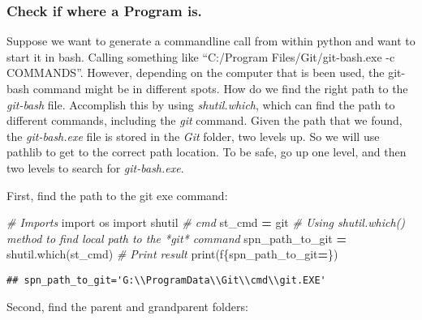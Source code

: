 \documentclass[
]{book}
\newenvironment{Shaded}{\begin{snugshade}}{\end{snugshade}}
\newcommand{\BuiltInTok}[1]{#1}
\newcommand{\CommentTok}[1]{\textcolor[rgb]{0.56,0.35,0.01}{\textit{#1}}}
\newcommand{\ImportTok}[1]{#1}
\newcommand{\NormalTok}[1]{#1}
\newcommand{\OperatorTok}[1]{\textcolor[rgb]{0.81,0.36,0.00}{\textbf{#1}}}
\newcommand{\SpecialCharTok}[1]{\textcolor[rgb]{0.00,0.00,0.00}{#1}}
\newcommand{\SpecialStringTok}[1]{\textcolor[rgb]{0.31,0.60,0.02}{#1}}
\newcommand{\StringTok}[1]{\textcolor[rgb]{0.31,0.60,0.02}{#1}}
\begin{document}
\hypertarget{check-if-where-a-program-is.}{%
\subsubsection{Check if where a Program is.}\label{check-if-where-a-program-is.}}

Suppose we want to generate a commandline call from within python and want to start it in bash. Calling something like ``C:/Program Files/Git/git-bash.exe -c COMMANDS''. However, depending on the computer that is been used, the git-bash command might be in different spots. How do we find the right path to the \emph{git-bash} file. Accomplish this by using \emph{shutil.which}, which can find the path to different commands, including the \emph{git} command. Given the path that we found, the \emph{git-bash.exe} file is stored in the \emph{Git} folder, two levels up. So we will use pathlib to get to the correct path location. To be safe, go up one level, and then two levels to search for \emph{git-bash.exe}.

First, find the path to the git exe command:

\begin{Shaded}
\begin{Highlighting}[]
\CommentTok{\# Imports}
\ImportTok{import}\NormalTok{ os  }
\ImportTok{import}\NormalTok{ shutil  }
\CommentTok{\# cmd  }
\NormalTok{st\_cmd }\OperatorTok{=} \StringTok{\textquotesingle{}git\textquotesingle{}}
\CommentTok{\# Using shutil.which() method to find local path to the *git* command}
\NormalTok{spn\_path\_to\_git }\OperatorTok{=}\NormalTok{ shutil.which(st\_cmd) }
\CommentTok{\# Print result }
\BuiltInTok{print}\NormalTok{(}\SpecialStringTok{f\textquotesingle{}}\SpecialCharTok{\{}\NormalTok{spn\_path\_to\_git}\OperatorTok{=}\SpecialCharTok{\}}\SpecialStringTok{\textquotesingle{}}\NormalTok{)}
\end{Highlighting}
\end{Shaded}

\begin{verbatim}
## spn_path_to_git='G:\\ProgramData\\Git\\cmd\\git.EXE'
\end{verbatim}

Second, find the parent and grandparent folders:
\end{document}
